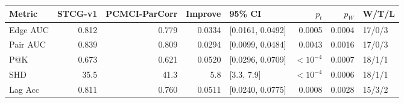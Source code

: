 \begin{tabular}{lrrrlrrl}
\toprule
Metric & STCG-v1 & PCMCI-ParCorr & Improve & 95\% CI & $p_t$ & $p_W$ & W/T/L \\
\midrule
Edge AUC & 0.812 & 0.779 & 0.0334 & [0.0161, 0.0492] & 0.0005 & 0.0004 & 17/0/3 \\
Pair AUC & 0.839 & 0.809 & 0.0294 & [0.0099, 0.0484] & 0.0043 & 0.0016 & 17/0/3 \\
P@K & 0.673 & 0.621 & 0.0520 & [0.0296, 0.0709] & $<10^{-4}$ & 0.0007 & 18/1/1 \\
SHD & 35.5 & 41.3 & 5.8 & [3.3, 7.9] & $<10^{-4}$ & 0.0006 & 18/1/1 \\
Lag Acc & 0.811 & 0.760 & 0.0511 & [0.0240, 0.0775] & 0.0008 & 0.0028 & 15/3/2 \\
\bottomrule
\end{tabular}
